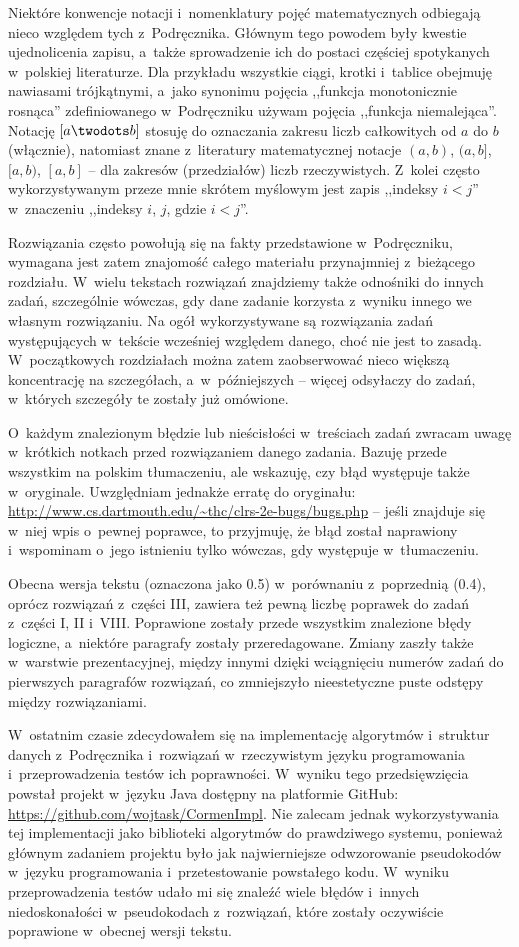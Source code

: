 Niektóre konwencje notacji i~nomenklatury pojęć matematycznych odbiegają nieco względem tych z~Podręcznika.
Głównym tego powodem były kwestie ujednolicenia zapisu, a~także sprowadzenie ich do postaci częściej spotykanych w~polskiej literaturze.
Dla przykładu wszystkie ciągi, krotki i~tablice obejmuję nawiasami trójkątnymi, a~jako synonimu pojęcia ,,funkcja monotonicznie rosnąca'' zdefiniowanego w~Podręczniku używam pojęcia ,,funkcja niemalejąca''.
Notację $[a\twodots b]$ stosuję do oznaczania zakresu liczb całkowitych od $a$ do $b$ (włącznie), natomiast znane z~literatury matematycznej notacje $(a,b)$, $(a,b]$, $[a,b)$, $[a,b]$ -- dla zakresów (przedziałów) liczb rzeczywistych.
Z~kolei często wykorzystywanym przeze mnie skrótem myślowym jest zapis ,,indeksy $i<j$'' w~znaczeniu ,,indeksy $i$, $j$, gdzie $i<j$''.

Rozwiązania często powołują się na fakty przedstawione w~Podręczniku, wymagana jest zatem znajomość całego materiału przynajmniej z~bieżącego rozdziału.
W~wielu tekstach rozwiązań znajdziemy także odnośniki do innych zadań, szczególnie wówczas, gdy dane zadanie korzysta z~wyniku innego we własnym rozwiązaniu.
Na ogół wykorzystywane są rozwiązania zadań występujących w~tekście wcześniej względem danego, choć nie jest to zasadą.
W~początkowych rozdziałach można zatem zaobserwować nieco większą koncentrację na szczegółach, a~w~późniejszych -- więcej odsyłaczy do zadań, w~których szczegóły te zostały już omówione.

O~każdym znalezionym błędzie lub nieścisłości w~treściach zadań zwracam uwagę w~krótkich notkach przed rozwiązaniem danego zadania.
Bazuję przede wszystkim na polskim tłumaczeniu, ale wskazuję, czy błąd występuje także w~oryginale.
Uwzględniam jednakże erratę do oryginału: \url{http://www.cs.dartmouth.edu/~thc/clrs-2e-bugs/bugs.php} -- jeśli znajduje się w~niej wpis o~pewnej poprawce, to przyjmuję, że błąd został naprawiony i~wspominam o~jego istnieniu tylko wówczas, gdy występuje w~tłumaczeniu.

Obecna wersja tekstu (oznaczona jako 0.5) w~porównaniu z~poprzednią (0.4), oprócz rozwiązań z~części III, zawiera też pewną liczbę poprawek do zadań z~części I, II i~VIII.
Poprawione zostały przede wszystkim znalezione błędy logiczne, a~niektóre paragrafy zostały przeredagowane.
Zmiany zaszły także w~warstwie prezentacyjnej, między innymi dzięki wciągnięciu numerów zadań do pierwszych paragrafów rozwiązań, co zmniejszyło nieestetyczne puste odstępy między rozwiązaniami.

W~ostatnim czasie zdecydowałem się na implementację algorytmów i~struktur danych z~Podręcznika i~rozwiązań w~rzeczywistym języku programowania i~przeprowadzenia testów ich poprawności.
W~wyniku tego przedsięwzięcia powstał projekt w~języku Java dostępny na platformie GitHub: \url{https://github.com/wojtask/CormenImpl}.
Nie zalecam jednak wykorzystywania tej implementacji jako biblioteki algorytmów do prawdziwego systemu, ponieważ głównym zadaniem projektu było jak najwierniejsze odwzorowanie pseudokodów w~języku programowania i~przetestowanie powstałego kodu.
W~wyniku przeprowadzenia testów udało mi się znaleźć wiele błędów i~innych niedoskonałości w~pseudokodach z~rozwiązań, które zostały oczywiście poprawione w~obecnej wersji tekstu.

